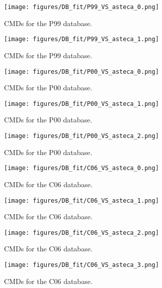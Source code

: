 \documentclass{aa}
\begin{document}
\begin{appendix}
\begin{figure*}
\texttt{[image: figures/DB\_fit/P99\_VS\_asteca\_0.png]}
\caption{CMDs for the P99 database.}
\label{fig:DBs_P99_0}
\end{figure*}
\clearpage

\begin{figure*}
\texttt{[image: figures/DB\_fit/P99\_VS\_asteca\_1.png]}
\caption{CMDs for the P99 database.}
\label{fig:DBs_P99_1}
\end{figure*}
\clearpage

\begin{figure*}
\texttt{[image: figures/DB\_fit/P00\_VS\_asteca\_0.png]}
\caption{CMDs for the P00 database.}
\label{fig:DBs_P00_0}
\end{figure*}
\clearpage

\begin{figure*}
\texttt{[image: figures/DB\_fit/P00\_VS\_asteca\_1.png]}
\caption{CMDs for the P00 database.}
\label{fig:DBs_P00_1}
\end{figure*}
\clearpage

\begin{figure*}
\texttt{[image: figures/DB\_fit/P00\_VS\_asteca\_2.png]}
\caption{CMDs for the P00 database.}
\label{fig:DBs_P00_2}
\end{figure*}
\clearpage

\begin{figure*}
\texttt{[image: figures/DB\_fit/C06\_VS\_asteca\_0.png]}
\caption{CMDs for the C06 database.}
\label{fig:DBs_C06_0}
\end{figure*}
\clearpage

\begin{figure*}
\texttt{[image: figures/DB\_fit/C06\_VS\_asteca\_1.png]}
\caption{CMDs for the C06 database.}
\label{fig:DBs_C06_1}
\end{figure*}
\clearpage

\begin{figure*}
\texttt{[image: figures/DB\_fit/C06\_VS\_asteca\_2.png]}
\caption{CMDs for the C06 database.}
\label{fig:DBs_C06_2}
\end{figure*}
\clearpage

\begin{figure}
\texttt{[image: figures/DB\_fit/C06\_VS\_asteca\_3.png]}
\caption{CMDs for the C06 database.}
\label{fig:DBs_C06_3}
\end{figure}
\clearpage


\end{appendix}
\end{document}
